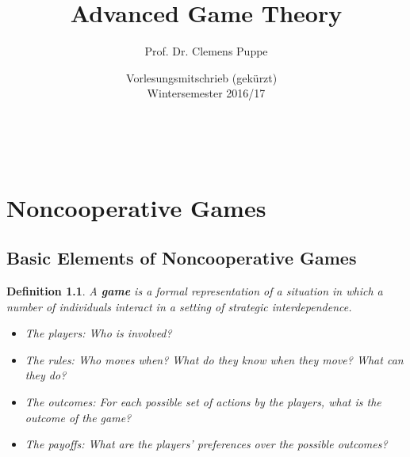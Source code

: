 \documentclass[12pt]{extreport} %
\title{Advanced Game Theory}
\author{Prof. Dr. Clemens Puppe}
\date{Vorlesungsmitschrieb (gekürzt) ~\vspace{0.2cm} \\ Wintersemester 2016/17}
\makeatletter
\theoremstyle{named}
\theoremstyle{itshape}
\newtheorem*{definition}{Definition}
\theoremstyle{normal}
\def\maketitle{ \begin{titlepage} 
			~\vspace{3cm} 
		\begin{center} {\Huge \@title} \end{center} 
	 		\vspace*{1cm} 
	 	\begin{center} {\large \@author} \end{center} 
	 	\begin{center} \@date \end{center} 
	 		\vspace*{7cm} 
	 	\begin{center} \@publishers \end{center} 
	 		\vfill 
	\end{titlepage} }
\makeatother
\begin{document}
\begin{titlepage}
	\maketitle
	\thispagestyle{empty}
\end{titlepage}
	
\tableofcontents
\thispagestyle{empty} 
  
\chapter{Noncooperative Games}

\section{Basic Elements of Noncooperative Games}


\begin{definition}
	A \textbf{game} is a formal representation of a situation in which a number of individuals interact in a setting of strategic interdependence.
	
	\begin{itemize}
		\item The players: Who is involved?
		\item The rules: Who moves when? What do they know when they move? What can they do?
		\item The outcomes: For each possible set of actions by the players, what is the outcome of the game?
		\item The payoffs: What are the players' preferences over the possible outcomes?
	\end{itemize} 
\end{definition}
\end{document}
